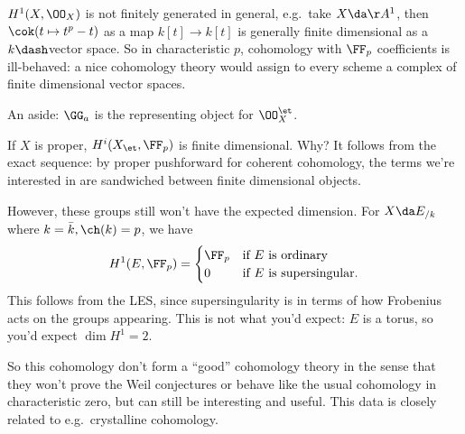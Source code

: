 \begin{remark}

\(H^1(X, \OO_X)\) is not finitely generated in general, e.g.~take
\(X \da \AA^1\), then \(\cok(t\mapsto t^p - t)\) as a map
\(k[t] \to k[t]\) is generally finite dimensional as a \(k\dash\)vector
space. So in characteristic \(p\), cohomology with \(\FF_p\)
coefficients is ill-behaved: a nice cohomology theory would assign to
every scheme a complex of finite dimensional vector spaces.

\end{remark}

\begin{remark}

An aside: \(\GG_a\) is the representing object for \(\OO_X^\et\).

\end{remark}

\begin{remark}

If \(X\) is proper, \(H^i(X_\et, \FF_p)\) is finite dimensional. Why? It
follows from the exact sequence: by proper pushforward for coherent
cohomology, the terms we're interested in are sandwiched between finite
dimensional objects.

\end{remark}

\begin{example}[?]

However, these groups still won't have the expected dimension. For
\(X \da E_{/k}\) where \(k=\bar k, \ch(k) = p\), we have
\begin{align*}  
H^1(E, \FF_p) = 
\begin{cases}
\FF_p & \text{if $E$ is ordinary} \\
0 & \text{if $E$ is supersingular}.
\end{cases}
\end{align*} This follows from the LES, since supersingularity is in
terms of how Frobenius acts on the groups appearing. This is not what
you'd expect: \(E\) is a torus, so you'd expect \(\dim H^1 = 2\).

\end{example}

\begin{remark}

So this cohomology don't form a ``good'' cohomology theory in the sense
that they won't prove the Weil conjectures or behave like the usual
cohomology in characteristic zero, but can still be interesting and
useful. This data is closely related to e.g.~crystalline cohomology.

\end{remark}

